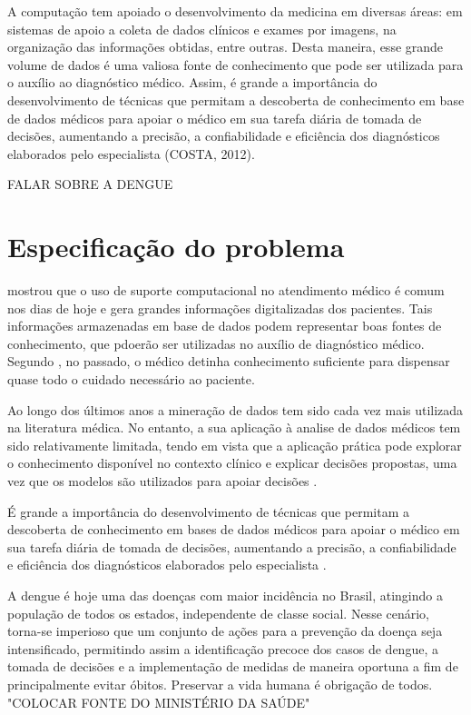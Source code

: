 \documentclass[
	12pt,				%
	openright,			%
	oneside,	
	a4paper,				%
	english,				%
	brazil				%
]{abntex2/abntex2} %
\begin{document}
	A computação tem apoiado o desenvolvimento da medicina em diversas áreas: em sistemas de apoio a coleta de dados clínicos e exames por imagens, na organização das informações obtidas, entre outras. Desta maneira, esse grande volume de dados é uma valiosa fonte de conhecimento que pode ser utilizada para o auxílio ao diagnóstico médico. Assim, é grande a importância do desenvolvimento de técnicas que permitam a descoberta de conhecimento em base de dados médicos para apoiar o médico em sua tarefa diária de tomada de decisões, aumentando a precisão, a confiabilidade e eficiência dos diagnósticos elaborados pelo especialista (COSTA, 2012).
	
	FALAR SOBRE A DENGUE

	\section{Especificação do problema}
	
		\cite{costa:2012} mostrou que o uso de suporte computacional no atendimento médico é comum nos dias de hoje e gera grandes informações digitalizadas dos pacientes. Tais informações armazenadas em base de dados podem representar boas fontes de conhecimento, que pdoerão ser utilizadas no auxílio de diagnóstico médico. Segundo \cite{bezerra:2009}, no passado, o médico detinha conhecimento suficiente para dispensar quase todo o cuidado necessário ao paciente.
		
		Ao longo dos últimos anos a mineração de dados tem sido cada vez mais utilizada na literatura médica. No entanto, a sua aplicação à analise de dados médicos tem sido relativamente limitada, tendo em vista que a aplicação prática pode explorar o conhecimento disponível no contexto clínico e explicar decisões propostas, uma vez que os modelos são utilizados para apoiar decisões \cite{bellazzi:2008}.
		
		É grande a importância do desenvolvimento de técnicas que permitam a descoberta de conhecimento em bases de dados médicos para apoiar o médico em sua tarefa diária de tomada de decisões, aumentando a precisão, a confiabilidade e eficiência dos diagnósticos elaborados pelo especialista \cite{costa:2012}.
		
		A dengue é hoje uma das doenças com maior incidência no Brasil, atingindo a população de todos os estados, independente de classe social. Nesse cenário, torna-se imperioso que um conjunto de ações para a prevenção da doença seja intensificado, permitindo assim a identificação precoce dos casos de dengue, a tomada de decisões e a implementação de medidas de maneira oportuna a fim de principalmente evitar óbitos. Preservar a vida humana é obrigação de todos. "COLOCAR FONTE DO MINISTÉRIO DA SAÚDE"
\end{document}
